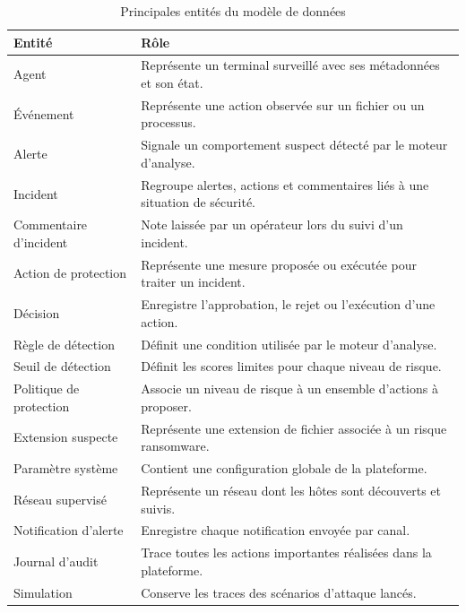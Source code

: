 \begin{table}[htbp]
\centering
\caption{Principales entités du modèle de données}
\label{tab:entites-modele-donnees}
\small
\renewcommand{\arraystretch}{1.3}
\begin{tabularx}{\textwidth}{|p{4.5cm}|X|}
\hline
\textbf{Entité} & \textbf{Rôle} \\
\hline
Agent & Représente un terminal surveillé avec ses métadonnées et son état. \\
\hline
Événement & Représente une action observée sur un fichier ou un processus. \\
\hline
Alerte & Signale un comportement suspect détecté par le moteur d'analyse. \\
\hline
Incident & Regroupe alertes, actions et commentaires liés à une situation de sécurité. \\
\hline
Commentaire d'incident & Note laissée par un opérateur lors du suivi d'un incident. \\
\hline
Action de protection & Représente une mesure proposée ou exécutée pour traiter un incident. \\
\hline
Décision & Enregistre l'approbation, le rejet ou l'exécution d'une action. \\
\hline
Règle de détection & Définit une condition utilisée par le moteur d'analyse. \\
\hline
Seuil de détection & Définit les scores limites pour chaque niveau de risque. \\
\hline
Politique de protection & Associe un niveau de risque à un ensemble d'actions à proposer. \\
\hline
Extension suspecte & Représente une extension de fichier associée à un risque ransomware. \\
\hline
Paramètre système & Contient une configuration globale de la plateforme. \\
\hline
Réseau supervisé & Représente un réseau dont les hôtes sont découverts et suivis. \\
\hline
Notification d'alerte & Enregistre chaque notification envoyée par canal. \\
\hline
Journal d'audit & Trace toutes les actions importantes réalisées dans la plateforme. \\
\hline
Simulation & Conserve les traces des scénarios d'attaque lancés. \\
\hline
\end{tabularx}
\end{table}
\newpage

